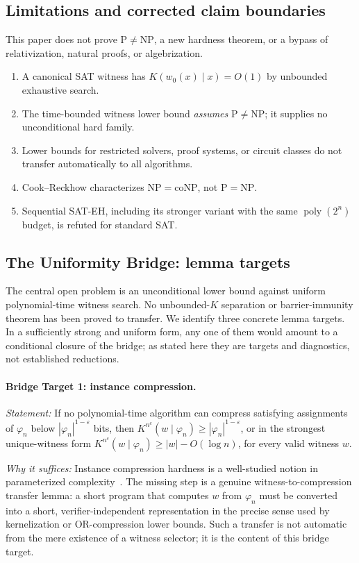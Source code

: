 \documentclass[aps,prd,twocolumn,superscriptaddress,nofootinbib]{revtex4-2}
\theoremstyle{definition}
\theoremstyle{remark}
\DeclareMathOperator{\poly}{poly}
\newcommand{\NP}{\mathrm{NP}}
\newcommand{\PP}{\mathrm{P}}
\newcommand{\coNP}{\mathrm{coNP}}
\begin{document}
\subsection{Limitations and corrected claim boundaries}
This paper does not prove $\PP\ne\NP$, a new hardness theorem,
or a bypass of relativization, natural proofs, or algebrization.
\begin{enumerate}
\item A canonical SAT witness has $K(w_0(x)\mid x)=O(1)$
by unbounded exhaustive search.
\item The time-bounded witness lower bound \emph{assumes}
$\PP\ne\NP$; it supplies no unconditional hard family.
\item Lower bounds for restricted solvers, proof systems,
or circuit classes do not transfer automatically to all algorithms.
\item Cook--Reckhow characterizes $\NP=\coNP$, not $\PP=\NP$.
\item Sequential SAT-EH, including its stronger variant with
the same $\poly(2^n)$ budget, is refuted for standard SAT.
\end{enumerate}

\subsection{The Uniformity Bridge: lemma targets}
\label{sec:uniformity-bridge}

The central open problem is an unconditional lower bound against uniform polynomial-time witness search. No unbounded-$K$ separation or barrier-immunity theorem has been proved to transfer. We identify three concrete lemma targets. In a sufficiently strong and uniform form, any one of them would amount to a conditional closure of the bridge; as stated here they are targets and diagnostics, not established reductions.

\paragraph*{Bridge Target 1: instance compression.}
\emph{Statement:} If no polynomial-time algorithm can compress satisfying assignments of $\varphi_n$ below $|\varphi_n|^{1-\varepsilon}$ bits, then $K^{n^c}(w \mid \varphi_n) \geq |\varphi_n|^{1-\varepsilon}$, or in the strongest unique-witness form $K^{n^c}(w \mid \varphi_n) \geq |w| - O(\log n)$, for every valid witness $w$.

\emph{Why it suffices:} Instance compression hardness is a well-studied notion in parameterized complexity~\cite{FortnowSanthanam2011,DellMelkebeek2014}. The missing step is a genuine witness-to-compression transfer lemma: a short program that computes $w$ from $\varphi_n$ must be converted into a short, verifier-independent representation in the precise sense used by kernelization or OR-compression lower bounds. Such a transfer is not automatic from the mere existence of a witness selector; it is the content of this bridge target.
\end{document}
